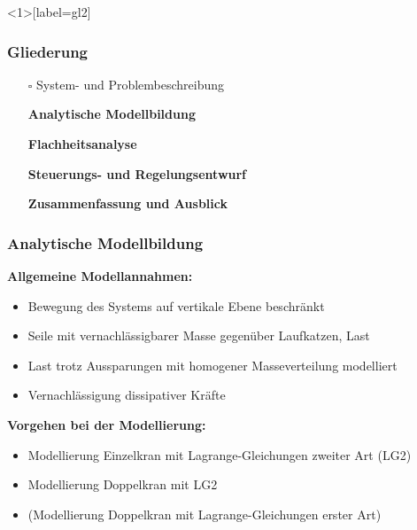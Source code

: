 \documentclass[
	ngerman,
	10pt,				%
	aspectratio=169 	%
]{beamer}
\newcommand{\cdbox}{$\square$\hspace{-0.65em}\raisebox{0.1em}{\checkmark}\hspace{-0.18em}}
\begin{document}

\begin{frame}<1>[label=gl2]
	\frametitle{Gliederung}
	\begin{itemize}
		\item[\cdbox] System- und Problembeschreibung
		\item[\only<1>{$\rightarrow$}\only<2>{$\rightarrow$}\only<3->{\cdbox}]
		\textbf<1>{Analytische Modellbildung}
		\item[\only<1>{$\square$}\only<2>{$\rightarrow$}\only<3->{\cdbox}]
		\textbf<2>{Flachheitsanalyse}
		\item[\only<1-2>{$\square$}\only<3>{$\rightarrow$}\only<4->{\cdbox}]
		\textbf<3>{Steuerungs- und Regelungsentwurf}
		\item[\only<1-2>{$\square$}\only<3>{$\rightarrow$}\only<4->{\cdbox}]
		\textbf<3>{Zusammenfassung und Ausblick}
	\end{itemize}
\end{frame}


\begin{frame}[label=analMB]
	\frametitle{Analytische Modellbildung}
	\textbf{Allgemeine Modellannahmen:}
	\begin{itemize}
		\item Bewegung des Systems auf vertikale Ebene beschränkt
		\pause
		\item Seile mit vernachlässigbarer Masse gegenüber Laufkatzen, Last
		\pause
		\item Last trotz Aussparungen mit homogener Masseverteilung modelliert
		\pause
		\item Vernachlässigung dissipativer Kräfte 
	\end{itemize}

	\pause
	\bigskip
	\textbf{Vorgehen bei der Modellierung:}
	\begin{itemize}
		\item Modellierung Einzelkran mit Lagrange-Gleichungen zweiter Art (LG2)
		\pause
		\item Modellierung Doppelkran mit LG2
		\pause
		\item (Modellierung Doppelkran mit Lagrange-Gleichungen erster Art)
	\end{itemize}
\end{frame}

\end{document}
